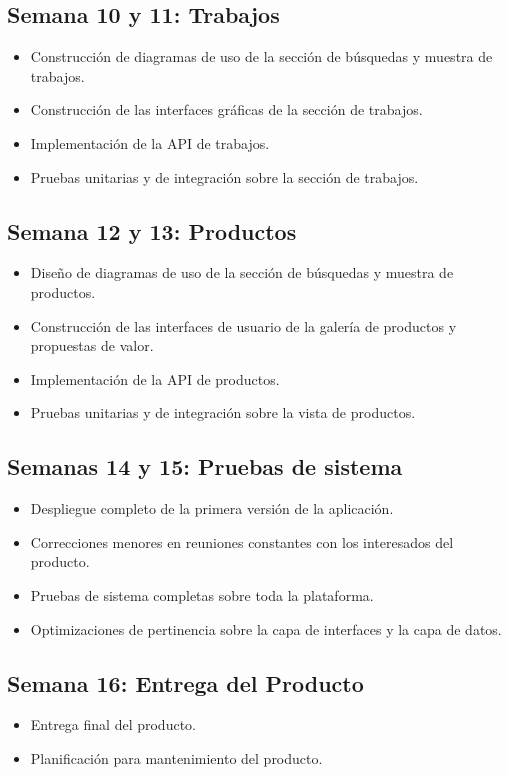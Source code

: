 \subsection{Semana 10 y 11: Trabajos}

\begin{itemize}
    \item Construcción de diagramas de uso de la sección de búsquedas y muestra de trabajos.
    \item Construcción de las interfaces gráficas de la sección de trabajos.
    \item Implementación de la API de trabajos.
    \item Pruebas unitarias y de integración sobre la sección de trabajos.
\end{itemize}

\subsection{Semana 12 y 13: Productos}

\begin{itemize}
    \item Diseño de diagramas de uso de la sección de búsquedas y muestra de productos.
    \item Construcción de las interfaces de usuario de la galería de productos y propuestas de valor.
    \item Implementación de la API de productos.
    \item Pruebas unitarias y de integración sobre la vista de productos.
\end{itemize}

\subsection{Semanas 14 y 15: Pruebas de sistema}

\begin{itemize}
    \item Despliegue completo de la primera versión de la aplicación.
    \item Correcciones menores en reuniones constantes con los interesados del producto.
    \item Pruebas de sistema completas sobre toda la plataforma.
    \item Optimizaciones de pertinencia sobre la capa de interfaces y la capa de datos.
\end{itemize}

\subsection{Semana 16: Entrega del Producto}

\begin{itemize}
    \item Entrega final del producto.
    \item Planificación para mantenimiento del producto.
\end{itemize}